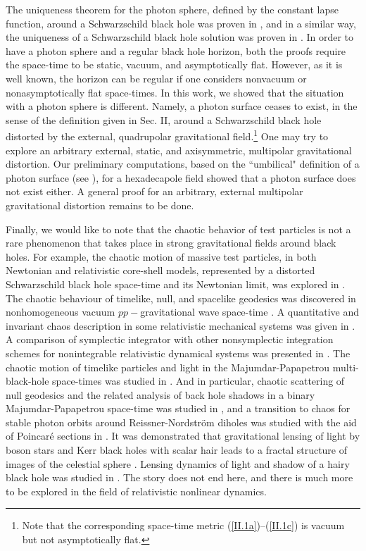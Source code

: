 \documentclass[twocolumn,showpacs,preprintnumbers,amsmath,amssymb,floatfix,nofootinbib]{revtex4-1}
\newcommand{\eq}[1]{(\ref{#1})}
\begin{document}
The uniqueness theorem for the photon sphere, defined by the constant lapse function, around a Schwarzschild black hole was proven in \cite{Cederbaum:2014gva}, and in a similar way, the uniqueness of a Schwarzschild black hole solution was proven in \cite{Israel:1967wq}. In order to have a photon sphere and a regular black hole horizon, both the proofs require the space-time to be static, vacuum, and asymptotically flat. However, as it is well known, the horizon can be regular if one considers nonvacuum or nonasymptotically flat space-times. In this work, we showed that the situation with a photon sphere is different. Namely, a photon surface ceases to exist, in the sense of the definition given in Sec. II, around a Schwarzschild black hole distorted by the external, quadrupolar gravitational field.\footnote{Note that the corresponding space-time metric \eq{II.1a}--\eq{II.1c} is vacuum but not asymptotically flat.} One may try to explore an arbitrary external, static, and axisymmetric, multipolar gravitational distortion. Our preliminary computations, based on the ``umbilical" definition of a photon surface (see \cite{Claudel:2000yi,Yoshino:2016kgi}), for a hexadecapole field showed that a photon surface does not exist either. A general proof for an arbitrary, external multipolar gravitational distortion remains to be done. 

Finally, we would like to note that the chaotic behavior of test particles is not a rare phenomenon that takes place in strong gravitational fields around black holes. For example, the chaotic motion of massive test particles, in both Newtonian and relativistic core-shell models, represented by a distorted Schwarzschild black hole space-time and its Newtonian limit, was explored in \cite{Vieira:1998hc}. The chaotic behaviour of timelike, null, and spacelike geodesics was discovered in nonhomogeneous vacuum $pp-$gravitational wave space-time \cite{Podolsky:1998ez}. A quantitative and invariant chaos description in some relativistic mechanical systems was given in \cite{Szydlowski:1996uf,Szydlowski:1997jp}. A comparison of symplectic integrator with other nonsymplectic integration schemes for 
nonintegrable relativistic dynamical systems was presented in \cite{Kopacek:2016jdz}. The chaotic motion of timelike particles and light in the Majumdar-Papapetrou multi-black-hole space-times was studied in \cite{Chandra,Contopoulos,Yurtsever:1994yb,Hanan:2006uf,Alonso:2007ts}. And in particular, chaotic scattering of null geodesics and the related analysis of back hole shadows in a binary Majumdar-Papapetrou space-time was studied in \cite{Shipley:2016omi}, and a transition to chaos for stable photon orbits around Reissner-Nordstr\"om diholes was studied with the aid of Poincar\'e sections in \cite{Dolan:2016bxj}. It was demonstrated that gravitational lensing of light by boson stars and Kerr black holes with scalar hair leads to a fractal structure of images of the celestial sphere \cite{Cunha:2015yba,Cunha:2016bjh}. Lensing dynamics of light and shadow of a hairy black hole was studied in \cite{Cunha:2017eoe,Grover:2017mhm}. The story does not end here, and there is much more to be explored in the field of relativistic nonlinear dynamics.
\end{document}
